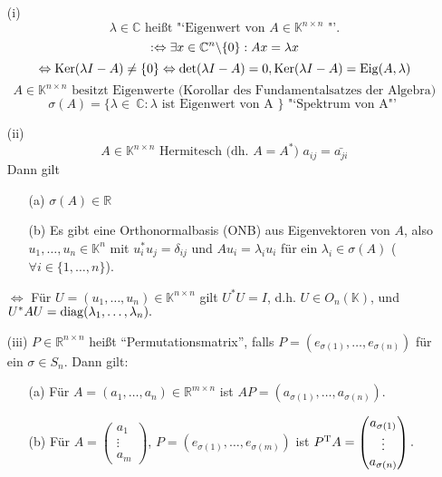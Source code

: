 \begin{enumerate}
\item[(i)]
\[
\lambda \in \mathbb{C}\text{ heißt "`Eigenwert von } A \in
\mathbb{K}^{n \times n} \text{ "'.} \]
\[
: \Leftrightarrow \exists x \in \mathbb{C}^n \backslash \{0\}: Ax = \lambda x \\
\]\[
\Leftrightarrow \operatorname*{\mathrm{Ker}} (\lambda I -A) \neq \{0\} \Leftrightarrow
\det (\lambda I -A) = 0, \operatorname*{\mathrm{Ker}} (\lambda I-A) = \operatorname*{\mathrm{Eig}}(A, \lambda)
\]\[
A \in \mathbb{K}^{n \times n} \text{ besitzt Eigenwerte (Korollar des
Fundamentalsatzes der Algebra)}
\]\[
\sigma (A) = \{ \lambda \in~ \mathbb{C}: \lambda \text{ ist Eigenwert
von A } \} \text{ "`Spektrum von A"' }
\]
\item[(ii)]
\[
A \in \mathbb{K}^{n \times n} \text{ Hermitesch (dh. } A = A^\ast \text{) } a_{ij} = \bar{a_{ji}}
\]
Dann gilt
\begin{enumerate}
\item[(a)]
$ \sigma(A) \in \mathbb{R}$
\item[(b)]
Es gibt eine Orthonormalbasis (ONB) aus Eigenvektoren von $A$, also  $u_1, \dots, u_n \in \mathbb{K}^n$ mit $u_i^{*} u_j = \delta_{ij}$
und $Au_i = \lambda_i u_i$ für ein $\lambda_i \in \sigma(A)$
($\forall i \in \{1, \dots, n\}$).
\end{enumerate}
$\Leftrightarrow$ Für $U = (u_1, \dots, u_n) \in \mathbb{K}^{n\times n}$ gilt $U^\ast U = I$,
d.h. $U \in O_n(\mathbb{K})$, und
$U^\ast A U = \operatorname*{\mathrm{diag}}(\lambda_1, \dots, \lambda_n).$
\item[(iii)]
$P \in \mathbb{R}^{n \times n}$ heißt "`Permutationsmatrix"',
falls $P=(e_{\sigma(1)}, \dots, e_{\sigma(n)})$ für ein $\sigma \in S_n$.
Dann gilt:
\begin{enumerate}
  \item[(a)] Für $A = (a_1, \dots, a_n) \in \mathbb{R}^{m \times n}$ ist
  $AP = (a_{\sigma(1)},\dots, a_{\sigma(n)}).$
  \item[(b)]
  Für $A = \begin{pmatrix} a_1 \\ \vdots \\ a_m \end{pmatrix}$,
      $P = (e_{\sigma(1)}, \dots, e_{\sigma(m)})$
  ist $P^\mathrm T A = \begin{pmatrix} a_{\sigma(1)} \\ \vdots \\ a_{\sigma(n)} \end{pmatrix}.$
\end{enumerate}
\end{enumerate}
